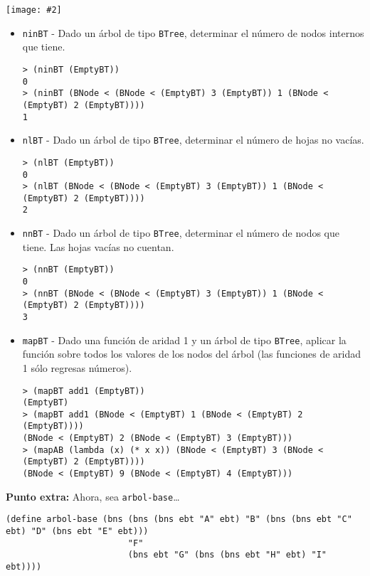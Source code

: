 \documentclass{article}
\newcommand{\jimage}[2]{\texttt{[image: \#2]}\vskip10pt}
\begin{document}
\jimage{0.9}{imgs/printbt1.png}

\newpage
\begin{itemize}
\item \texttt{ninBT} - Dado un árbol de tipo \verb;BTree;, determinar el número de nodos internos que tiene.
\begin{verbatim}
> (ninBT (EmptyBT))
0
> (ninBT (BNode < (BNode < (EmptyBT) 3 (EmptyBT)) 1 (BNode < (EmptyBT) 2 (EmptyBT))))
1
\end{verbatim}

\item \texttt{nlBT} - Dado un árbol de tipo \verb;BTree;, determinar el número de hojas no vacías.
\begin{verbatim}
> (nlBT (EmptyBT))
0
> (nlBT (BNode < (BNode < (EmptyBT) 3 (EmptyBT)) 1 (BNode < (EmptyBT) 2 (EmptyBT))))
2
\end{verbatim}

\item \texttt{nnBT} - Dado un árbol de tipo \verb;BTree;, determinar el número de nodos que tiene. Las hojas vacías no cuentan.
\begin{verbatim}
> (nnBT (EmptyBT))
0
> (nnBT (BNode < (BNode < (EmptyBT) 3 (EmptyBT)) 1 (BNode < (EmptyBT) 2 (EmptyBT))))
3
\end{verbatim}

\item \texttt{mapBT} - Dado una función de aridad 1 y un árbol de tipo \verb;BTree;, aplicar la función sobre todos los valores de los nodos del árbol (las funciones de aridad 1 sólo regresas números).
\begin{verbatim}
> (mapBT add1 (EmptyBT))
(EmptyBT)
> (mapBT add1 (BNode < (EmptyBT) 1 (BNode < (EmptyBT) 2 (EmptyBT))))
(BNode < (EmptyBT) 2 (BNode < (EmptyBT) 3 (EmptyBT)))
> (mapAB (lambda (x) (* x x)) (BNode < (EmptyBT) 3 (BNode < (EmptyBT) 2 (EmptyBT))))
(BNode < (EmptyBT) 9 (BNode < (EmptyBT) 4 (EmptyBT)))
\end{verbatim}
\end{itemize}

\newpage
\textbf{Punto extra:}
Ahora, sea \verb;arbol-base;\dots
\begin{verbatim}
(define arbol-base (bns (bns (bns ebt "A" ebt) "B" (bns (bns ebt "C" ebt) "D" (bns ebt "E" ebt))) 
                        "F"
                        (bns ebt "G" (bns (bns ebt "H" ebt) "I" ebt))))
\end{verbatim}
\end{document}
